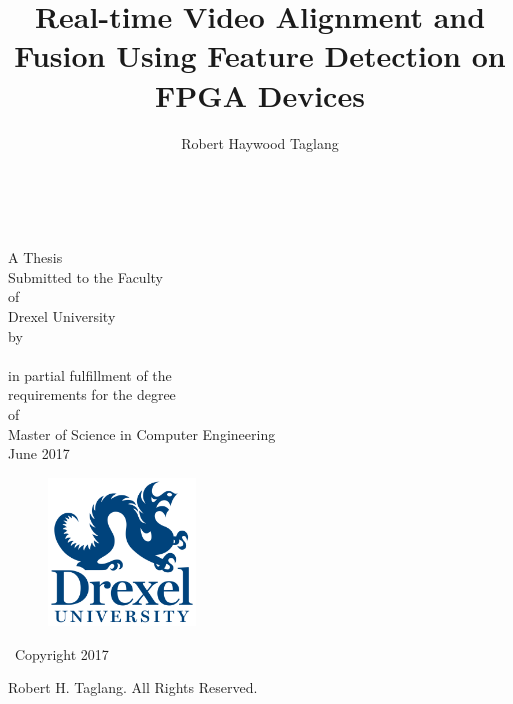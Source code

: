 \documentclass{article}
\title{Real-time Video Alignment and Fusion Using Feature Detection on FPGA Devices}
\author{Robert Haywood Taglang}
\begin{document}
\begin{titlingpage}
    \vspace*{\fill}
    \begin{center}
        \textbf{\thetitle}
        
        \hfill \\
        \hfill \\
        
        A Thesis \\
        Submitted to the Faculty \\
        of \\
        Drexel University \\
        by \\
        \theauthor \\
        in partial fulfillment of the \\
        requirements for the degree \\
        of \\
        Master of Science in Computer Engineering \\
        June 2017 \\
    \end{center}
    
    \vspace*{\fill}
    
    \begin{figure}[!b]
    	\centering
       	\includegraphics[width=0.35\textwidth]{drexel-vert-blue}
    \end{figure}
\end{titlingpage}

\begin{center}
	\vspace*{\fill}
	
	\textcopyright\  Copyright 2017
	
	Robert H. Taglang. All Rights Reserved.
	
	\vspace*{\fill}
\end{center}
\clearpage
\end{document}
